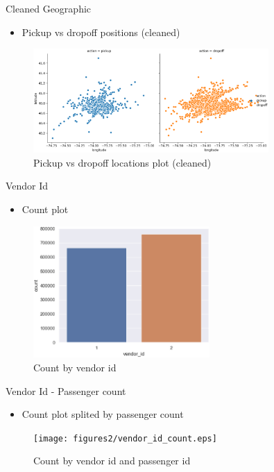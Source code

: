 \documentclass[
 size=12pt,
 paper=smartboard, %
 mode=present, %
 display=slides, %
style=tuliplab,
pauseslide,
fleqn,leqno]{powerdot}
\begin{document}
\begin{slide}{Cleaned Geographic}
  \begin{itemize}
    \item Pickup vs dropoff positions (cleaned)
  \end{itemize}
  \begin{figure}[h]
    \centering
    \includegraphics[width=0.8\textwidth]{figures2/pd.eps}
    \caption{Pickup vs dropoff locations plot (cleaned)}
    \label{fig:clean-geographic}
  \end{figure}
\end{slide}


\begin{slide}{Vendor Id}
  \begin{itemize}
    \item Count plot
  \end{itemize}
  \begin{figure}[h]
    \centering
    \includegraphics[width=0.6\textwidth]{figures2/vendor_id.eps}
    \caption{Count by vendor id}
    \label{fig:vendor-id}
  \end{figure}
\end{slide}

\begin{slide}{Vendor Id - Passenger count}
  \begin{itemize}
    \item Count plot splited by passenger count
  \end{itemize}
  \begin{figure}[h]
    \centering
    \texttt{[image: figures2/vendor\_id\_count.eps]}
    \caption{Count by vendor id and passenger id}
    \label{fig:vendor-id-passenger-count}
  \end{figure}
\end{slide}
\end{document}

